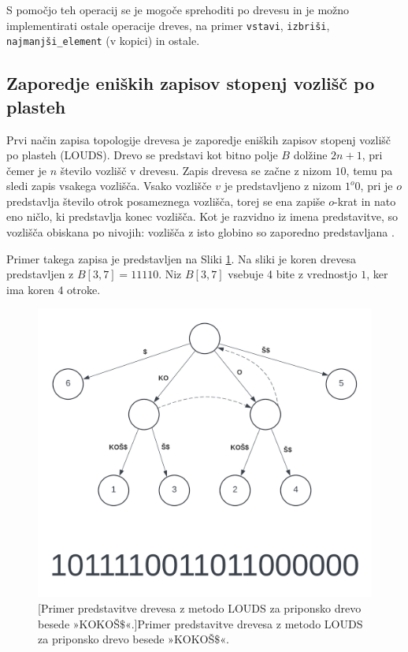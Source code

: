 S pomočjo teh operacij se je mogoče sprehoditi po drevesu in je možno implementirati ostale operacije dreves, na primer \texttt{vstavi}, \texttt{izbriši}, \texttt{najmanjši\_element} (v kopici) in ostale.

\subsection{Zaporedje eniških zapisov stopenj vozlišč po plasteh}\label{sec:LOUDS}

Prvi način zapisa topologije drevesa je zaporedje eniških zapisov stopenj vozlišč po plasteh (LOUDS). Drevo se predstavi kot bitno polje $B$ dolžine $2n+1$, pri čemer je $n$ število vozlišč v drevesu. Zapis drevesa se začne z nizom $10$, temu pa sledi zapis vsakega vozlišča. Vsako vozlišče $v$ je predstavljeno z nizom $1^o0$, pri je $o$ predstavlja število otrok posameznega vozlišča, torej se ena zapiše $o$-krat in nato eno ničlo, ki predstavlja konec vozlišča. Kot je razvidno iz imena predstavitve, so vozlišča obiskana po nivojih: vozlišča z isto globino so zaporedno predstavljana \cite{Navarro2016}.

Primer takega zapisa je predstavljen na Sliki \ref{fig:LOUDS}. Na sliki je koren drevesa predstavljen z $B[3,7]=11110$. Niz $B[3,7]$ vsebuje 4 bite z vrednostjo $1$, ker ima koren $4$ otroke.

\begin{figure}[htb]
    \begin{center}
        \includegraphics[width=.8\textwidth]{Slike/KokosSTLOUDR.png}
        [Primer predstavitve drevesa z metodo LOUDS za priponsko drevo besede »KOKOŠ$\$$«.]{Primer predstavitve drevesa z metodo LOUDS za priponsko drevo besede »KOKOŠ$\$$«.} 
        \label{fig:LOUDS}
    \end{center}
\end{figure}


